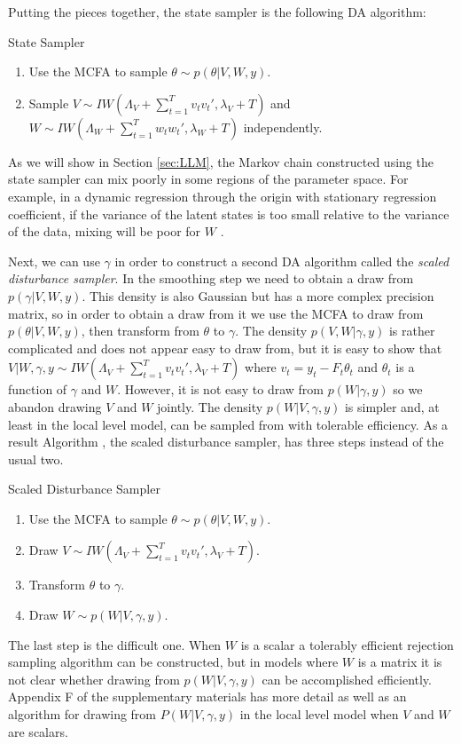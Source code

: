 \documentclass[12pt]{article}
\begin{document}
Putting the pieces together, the state sampler is the following DA algorithm:
\begin{alg*}[State]State Sampler
\label{alg:DLMstate}
\begin{enumerate}
\item Use the MCFA to sample $\theta \sim p(\theta|V,W,y)$.
\item Sample $V \sim IW\left(\Lambda_V + \sum_{t=1}^Tv_tv_t',\lambda_V + T\right)$ and $W \sim IW\left(\Lambda_W + \sum_{t=1}^Tw_tw_t',\lambda_{W} + T\right)$ independently.
\end{enumerate}
\end{alg*}
\noindent As we will show in Section \ref{sec:LLM}, the Markov chain constructed using the state sampler can mix poorly in some regions of the parameter space. For example, in a dynamic regression through the origin with stationary regression coefficient, if the variance of the latent states is too small relative to the variance of the data, mixing will be poor for $W$ \citep{fruhwirth2004efficient}.

Next, we can use $\gamma$ in order to construct a second DA algorithm called the {\it scaled disturbance sampler}. In the smoothing step we need to obtain a draw from $p(\gamma|V,W,y)$. This density is also Gaussian but has a more complex precision matrix, so in order to obtain a draw from it we use the MCFA to draw from $p(\theta|V,W,y)$, then transform from $\theta$ to $\gamma$. The density $p(V,W|\gamma,y)$ is rather complicated and does not appear easy to draw from, but it is easy to show that $V|W,\gamma,y \sim IW\left(\Lambda_V + \sum_{t=1}^Tv_tv_t',\lambda_V + T\right)$ where $v_t = y_t - F_t\theta_t$ and $\theta_t$ is a function of $\gamma$ and $W$. However, it is not easy to draw from $p(W|\gamma,y)$ so we abandon drawing $V$ and $W$ jointly. The density $p(W|V,\gamma,y)$ is simpler and, at least in the local level model, can be sampled from with tolerable efficiency. As a result Algorithm , the scaled disturbance sampler, has three steps instead of the usual two. 
\begin{alg*}[SD]Scaled Disturbance Sampler\label{alg:DLMdist}
\begin{enumerate}
\item Use the MCFA to sample $\theta \sim p(\theta|V,W,y)$.
\item Draw $V \sim IW\left(\Lambda_V + \sum_{t=1}^Tv_tv_t',\lambda_V + T\right)$.
\item Transform $\theta$ to $\gamma$.
\item Draw $W \sim p(W|V,\gamma,y)$.
\end{enumerate}
\end{alg*}\noindent
The last step is the difficult one. When $W$ is a scalar a tolerably efficient rejection sampling algorithm can be constructed, but in models where $W$ is a matrix it is not clear whether drawing from $p(W|V,\gamma,y)$ can be accomplished efficiently. Appendix F of the supplementary materials has more detail as well as an algorithm for drawing from $P(W|V,\gamma,y)$ in the local level model when $V$ and $W$ are scalars. 
\end{document}
